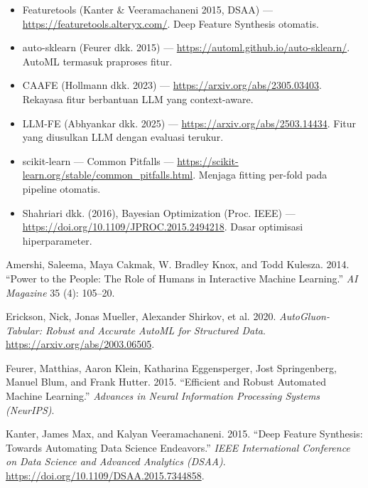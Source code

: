 \begin{bacaan}

\begin{itemize}
\tightlist
\item
  Featuretools (Kanter \& Veeramachaneni 2015, DSAA) --- \url{https://featuretools.alteryx.com/}. Deep Feature Synthesis otomatis.
\item
  auto-sklearn (Feurer dkk. 2015) --- \url{https://automl.github.io/auto-sklearn/}. AutoML termasuk praproses fitur.
\item
  CAAFE (Hollmann dkk. 2023) --- \url{https://arxiv.org/abs/2305.03403}. Rekayasa fitur berbantuan LLM yang context-aware.
\item
  LLM-FE (Abhyankar dkk. 2025) --- \url{https://arxiv.org/abs/2503.14434}. Fitur yang diusulkan LLM dengan evaluasi terukur.
\item
  scikit-learn --- Common Pitfalls --- \url{https://scikit-learn.org/stable/common_pitfalls.html}. Menjaga fitting per-fold pada pipeline otomatis.
\item
  Shahriari dkk. (2016), Bayesian Optimization (Proc. IEEE) --- \url{https://doi.org/10.1109/JPROC.2015.2494218}. Dasar optimisasi hiperparameter.
\end{itemize}

\end{bacaan}

\rujukanheading

\protect{}\label{refs}
\begin{CSLReferences}{1}{1}
Amershi, Saleema, Maya Cakmak, W. Bradley Knox, and Todd Kulesza. 2014. {``Power to the People: The Role of Humans in Interactive Machine Learning.''} \emph{AI Magazine} 35 (4): 105--20.

Erickson, Nick, Jonas Mueller, Alexander Shirkov, et al. 2020. \emph{{AutoGluon-Tabular}: Robust and Accurate {AutoML} for Structured Data}. \url{https://arxiv.org/abs/2003.06505}.

Feurer, Matthias, Aaron Klein, Katharina Eggensperger, Jost Springenberg, Manuel Blum, and Frank Hutter. 2015. {``Efficient and Robust Automated Machine Learning.''} \emph{Advances in Neural Information Processing Systems (NeurIPS)}.

Kanter, James Max, and Kalyan Veeramachaneni. 2015. {``Deep Feature Synthesis: Towards Automating Data Science Endeavors.''} \emph{IEEE International Conference on Data Science and Advanced Analytics (DSAA)}. \url{https://doi.org/10.1109/DSAA.2015.7344858}.

\end{CSLReferences}
